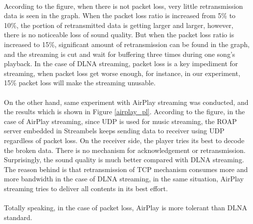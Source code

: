 \\
According to the figure, when there is not packet loss, very little retransmission data is seen in the graph. When the packet loss ratio is increased from 5\% to 10\%, the portion of retransmitted data is getting larger and larger, however, there is no noticeable loss of sound quality. But when the packet loss ratio is increased to 15\%, significant amount of retransmission can be found in the graph, and the streaming is cut and wait for buffering three times during one song's playback. In the case of DLNA streaming, packet loss is a key impediment for streaming, when packet loss get worse enough, for instance, in our experiment, 15\% packet loss will make the streaming unusable.\\
\\
On the other hand, same experiment with AirPlay streaming was conducted, and the results which is shown in Figure \ref{airplay_pl}. According to the figure, in the case of AirPlay streaming, since UDP is used for music streaming, the ROAP server embedded in Streambels keeps sending data to receiver using UDP regardless of packet loss. On the receiver side, the player tries its best to decode the broken data. There is no mechanism for acknowledgement or retransmission. Surprisingly, the sound quality is much better compared with DLNA streaming. The reason behind is that retransmission of TCP mechanism consumes more and more bandwidth in the case of DLNA streaming, in the same situation, AirPlay streaming tries to deliver all contents in its best effort.\\
\\
Totally speaking, in the case of packet loss, AirPlay is more tolerant than DLNA standard.
